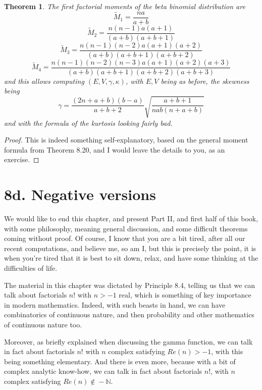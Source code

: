 \documentclass[12pt]{amsbook}
\newtheorem{theorem}{Theorem}[chapter]
\begin{document}
\begin{theorem}
The first factorial moments of the beta binomial distribution are
$$\widetilde{M}_1=\frac{na}{a+b}$$
$$\widetilde{M}_2=\frac{n(n-1)a(a+1)}{(a+b)(a+b+1)}$$
$$\widetilde{M}_3=\frac{n(n-1)(n-2)a(a+1)(a+2)}{(a+b)(a+b+1)(a+b+2)}$$
$$\widetilde{M}_4=\frac{n(n-1)(n-2)(n-3)a(a+1)(a+2)(a+3)}{(a+b)(a+b+1)(a+b+2)(a+b+3)}$$
and this allows computing $(E,V,\gamma,\kappa)$, with $E,V$ being as before, the skewness being 
$$\gamma=\frac{(2n+a+b)(b-a)}{a+b+2}\sqrt{\frac{a+b+1}{nab(n+a+b)}}$$
and with the formula of the kurtosis looking fairly bad.
\end{theorem}

\begin{proof}
This is indeed something self-explanatory, based on the general moment formula from Theorem 8.20, and I would leave the details to you, as an exercise.
\end{proof}

\section*{8d. Negative versions}

We would like to end this chapter, and present Part II, and first half of this book, with some philosophy, meaning general discussion, and some difficult theorems coming without proof. Of course, I know that you are a bit tired, after all our recent computations, and believe me, so am I, but this is precisely the point, it is when you're tired that it is best to sit down, relax, and have some thinking at the difficulties of life.

\bigskip

The material in this chapter was dictated by Principle 8.4, telling us that we can talk about factorials $n!$ with $n>-1$ real, which is something of key importance in modern mathematics. Indeed, with such beasts in hand, we can have combinatorics of continuous  nature, and then probability and other mathematics of continuous nature too. 

\bigskip

Moreover, as briefly explained when discussing the gamma function, we can talk in fact about factorials $n!$ with $n$ complex satisfying $Re(n)>-1$, with this being something elementary. And there is even more, because with a bit of complex analytic know-how, we can talk in fact about factorials $n!$, with $n$ complex satisfying $Re(n)\notin\!-\mathbb N$.

\bigskip
\end{document}
